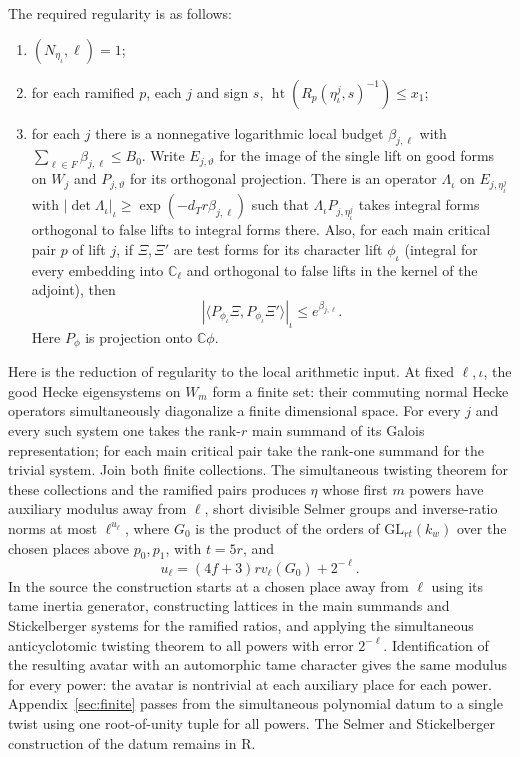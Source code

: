 The required regularity is as follows:
\begin{enumerate}
\item $(N_{\eta_\iota},\ell)=1$;
\item for each ramified $p$, each $j$ and sign $s$,
$\operatorname{ht}(R_p(\eta_\iota^j,s)^{-1})\le x_1$;
\item for each $j$ there is a nonnegative logarithmic local budget
$\beta_{j,\ell}$ with $\sum_{\ell\in F}\beta_{j,\ell}\le B_0$.
Write $E_{j,\vartheta}$ for the image of the single lift on good
forms on $W_j$ and $P_{j,\vartheta}$ for its orthogonal projection.
There is an operator $\Lambda_\iota$ on $E_{j,\eta_\iota^j}$
with $|\det\Lambda_\iota|_\iota\ge
\exp(-d_T r\beta_{j,\ell})$ such that
$\Lambda_\iota P_{j,\eta_\iota^j}$ takes integral forms
orthogonal to false lifts to integral forms there. Also, for each
main critical pair $p$ of lift $j$, if $\Xi,\Xi'$ are test forms
for its character lift $\phi_\iota$ (integral for every embedding into $\mathbb C_\ell$ and
orthogonal to false lifts in the kernel of the adjoint), then
\[
 |\langle P_{\phi_\iota}\Xi,P_{\phi_\iota}\Xi'\rangle|_\iota
       \le e^{\beta_{j,\ell}}.
\]
Here $P_\phi$ is projection onto $\mathbb C\phi$.
\end{enumerate}

Here is the reduction of regularity to the local arithmetic input.
At fixed $\ell,\iota$, the good Hecke eigensystems on $W_m$ form a
finite set: their commuting normal Hecke operators simultaneously
diagonalize a finite dimensional space. For every $j$ and every such
system one takes the rank-$r$ main summand of its Galois representation;
for each main critical pair take the rank-one summand for the trivial
system. Join both finite collections. The simultaneous twisting
theorem for these collections and the ramified pairs produces $\eta$
whose first $m$ powers have auxiliary modulus away from $\ell$,
short divisible Selmer groups and inverse-ratio norms at most
$\ell^{u_\ell}$, where $G_0$ is the product of the orders of $\mathrm{GL}_{rt}(k_w)$ over the chosen places above $p_0,p_1$, with $t=5r$, and
\[
 u_\ell=(4f+3)r v_\ell(G_0)+2^{-\ell}.
\]
In the source the construction starts at a chosen place away from $\ell$
using its tame inertia generator, constructing lattices in the main
summands and Stickelberger systems for the ramified ratios, and
applying the simultaneous anticyclotomic twisting theorem to all
powers with error $2^{-\ell}$. Identification of the resulting avatar
with an automorphic tame character gives the same modulus for every
power: the avatar is nontrivial at each auxiliary place for each
power. Appendix~\ref{sec:finite} passes from the simultaneous polynomial
datum to a single twist using one root-of-unity tuple for all powers.
The Selmer and Stickelberger construction of the datum remains in R.

